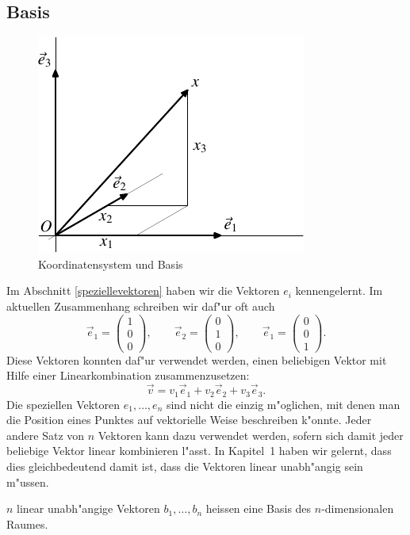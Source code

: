 \subsection{Basis}
\begin{figure}
\begin{center}
\includegraphics{images/v-5}
\end{center}
\caption{Koordinatensystem und Basis\label{imagebasis}}
\end{figure}
Im Abschnitt \ref{speziellevektoren} haben wir die Vektoren $e_i$
kennengelernt. Im aktuellen Zusammenhang schreiben wir daf"ur oft auch
\[
\vec e_1=\begin{pmatrix}1\\0\\0\end{pmatrix},\qquad
\vec e_2=\begin{pmatrix}0\\1\\0\end{pmatrix},\qquad
\vec e_1=\begin{pmatrix}0\\0\\1\end{pmatrix}.
\]
Diese Vektoren konnten daf"ur verwendet werden, einen beliebigen Vektor
mit Hilfe einer Linearkombination zusammenzusetzen:
\[
\vec v=
v_1\vec e_1+
v_2\vec e_2+
v_3\vec e_3.
\]
Die speziellen Vektoren $e_1,\dots,e_n$ sind nicht die einzig m"oglichen,
mit denen man die Position eines Punktes auf vektorielle Weise
beschreiben k"onnte. Jeder andere Satz von $n$ Vektoren kann
dazu verwendet werden, sofern sich damit jeder beliebige Vektor
linear kombinieren l"asst.  In Kapitel~1 haben wir gelernt, dass dies
gleichbedeutend damit ist, dass die Vektoren linear unabh"angig sein
m"ussen.
\begin{definition}
$n$ linear unabh"angige Vektoren $b_1,\dots,b_n$ heissen eine
Basis des $n$-dimensionalen Raumes.
\end{definition}
